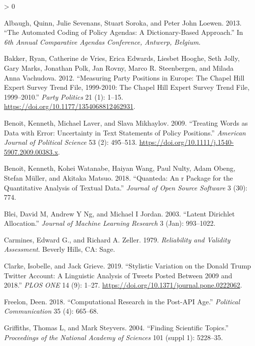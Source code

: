 \documentclass[
]{book}
\newlength{\cslhangindent}
\newenvironment{CSLReferences}[2] %
 {%
  \setlength{\parindent}{0pt}
  \ifodd #1 \everypar{\setlength{\hangindent}{\cslhangindent}}\ignorespaces\fi
  \ifnum #2 > 0
  \setlength{\parskip}{#2\baselineskip}
  \fi
 }%
 {}
\begin{document}
\hypertarget{refs}{}
\begin{CSLReferences}{1}{0}
\leavevmode\hypertarget{ref-Albaugh2013}{}%
Albaugh, Quinn, Julie Sevenans, Stuart Soroka, and Peter John Loewen. 2013. {``The Automated Coding of Policy Agendas: A Dictionary-Based Approach.''} In \emph{6th Annual Comparative Agendas Conference, Antwerp, Belgium}.

\leavevmode\hypertarget{ref-Bakker2012a}{}%
Bakker, Ryan, Catherine de Vries, Erica Edwards, Liesbet Hooghe, Seth Jolly, Gary Marks, Jonathan Polk, Jan Rovny, Marco R. Steenbergen, and Milada Anna Vachudova. 2012. {``Measuring Party Positions in Europe: The Chapel Hill Expert Survey Trend File, 1999-2010: The Chapel Hill Expert Survey Trend File, 1999--2010.''} \emph{Party Politics} 21 (1): 1--15. \url{https://doi.org/10.1177/1354068812462931}.

\leavevmode\hypertarget{ref-Benoit2009a}{}%
Benoit, Kenneth, Michael Laver, and Slava Mikhaylov. 2009. {``Treating Words as Data with Error: Uncertainty in Text Statements of Policy Positions.''} \emph{American Journal of Political Science} 53 (2): 495--513. \url{https://doi.org/10.1111/j.1540-5907.2009.00383.x}.

\leavevmode\hypertarget{ref-Benoit2018}{}%
Benoit, Kenneth, Kohei Watanabe, Haiyan Wang, Paul Nulty, Adam Obeng, Stefan Müller, and Akitaka Matsuo. 2018. {``Quanteda: An r Package for the Quantitative Analysis of Textual Data.''} \emph{Journal of Open Source Software} 3 (30): 774.

\leavevmode\hypertarget{ref-Blei2003a}{}%
Blei, David M, Andrew Y Ng, and Michael I Jordan. 2003. {``Latent Dirichlet Allocation.''} \emph{Journal of Machine Learning Research} 3 (Jan): 993--1022.

\leavevmode\hypertarget{ref-Carmines1979a}{}%
Carmines, Edward G., and Richard A. Zeller. 1979. \emph{Reliability and Validity Assessment}. Beverly Hills, CA: Sage.

\leavevmode\hypertarget{ref-Clarke2019a}{}%
Clarke, Isobelle, and Jack Grieve. 2019. {``Stylistic Variation on the Donald Trump Twitter Account: A Linguistic Analysis of Tweets Posted Between 2009 and 2018.''} \emph{PLOS ONE} 14 (9): 1--27. \url{https://doi.org/10.1371/journal.pone.0222062}.

\leavevmode\hypertarget{ref-Freelon2018}{}%
Freelon, Deen. 2018. {``Computational Research in the Post-API Age.''} \emph{Political Communication} 35 (4): 665--68.

\leavevmode\hypertarget{ref-Griffiths2004a}{}%
Griffiths, Thomas L, and Mark Steyvers. 2004. {``Finding Scientific Topics.''} \emph{Proceedings of the National Academy of Sciences} 101 (suppl 1): 5228--35.


\end{CSLReferences}
\end{document}
